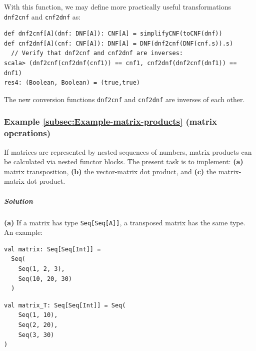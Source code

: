 With this function, we may define more practically useful transformations
\lstinline!dnf2cnf! and \lstinline!cnf2dnf! as:
\begin{lstlisting}
def dnf2cnf[A](dnf: DNF[A]): CNF[A] = simplifyCNF(toCNF(dnf))
def cnf2dnf[A](cnf: CNF[A]): DNF[A] = DNF(dnf2cnf(DNF(cnf.s)).s)
  // Verify that dnf2cnf and cnf2dnf are inverses:
scala> (dnf2cnf(cnf2dnf(cnf1)) == cnf1, cnf2dnf(dnf2cnf(dnf1)) == dnf1)
res4: (Boolean, Boolean) = (true,true)
\end{lstlisting}
The new conversion functions \lstinline!dnf2cnf! and \lstinline!cnf2dnf!
are inverses of each other.

\subsubsection{Example \label{subsec:Example-matrix-products}\ref{subsec:Example-matrix-products}
(matrix operations)}

If matrices are represented by nested sequences of numbers, matrix
products can be calculated via nested functor blocks. The present
task is to implement: \textbf{(a)} matrix transposition, \textbf{(b)}
the vector-matrix dot product, and \textbf{(c)} the matrix-matrix
dot product.

\subparagraph{Solution}

\textbf{(a)} If a matrix has type \lstinline!Seq[Seq[A]]!, a transposed
matrix has the same type. An example:

\begin{minipage}[t]{0.45\linewidth}%
\begin{lstlisting}
val matrix: Seq[Seq[Int]] =
  Seq(
    Seq(1, 2, 3),
    Seq(10, 20, 30)
  )
\end{lstlisting}
%
\end{minipage}\hfill{}%
\begin{minipage}[t]{0.48\linewidth}%
\begin{lstlisting}
val matrix_T: Seq[Seq[Int]] = Seq(
    Seq(1, 10),
    Seq(2, 20),
    Seq(3, 30)
)
\end{lstlisting}
%
\end{minipage}

